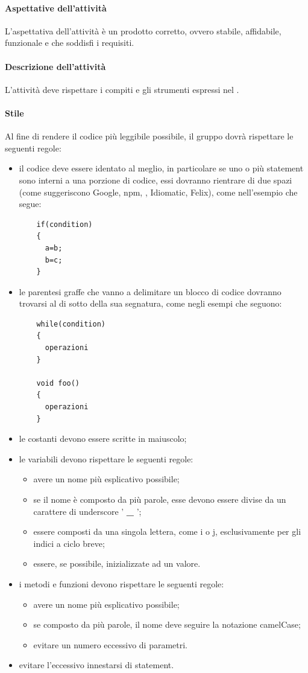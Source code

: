  \paragraph{Aspettative dell'attività}
 L'aspettativa dell'attività è un prodotto corretto, ovvero stabile, affidabile, funzionale e che soddisfi i requisiti.
 \paragraph{Descrizione dell'attività}
 L'attività deve rispettare i compiti e gli strumenti espressi nel \PPdocRP.
 \paragraph{Stile}

 Al fine di rendere il codice più leggibile possibile, il gruppo dovrà rispettare le seguenti regole:
 \begin{itemize}
 	\item il codice deve essere identato al meglio, in particolare se uno o più statement sono interni a una porzione di codice, essi dovranno rientrare di due spazi (come suggeriscono Google, npm, , Idiomatic, Felix), come nell'esempio che segue: \begin{lstlisting}
 	if(condition)
 	{
 	  a=b;
 	  b=c;
 	}
 	\end{lstlisting}
 	\item le parentesi graffe che vanno a delimitare un blocco di codice dovranno trovarsi al di sotto della sua segnatura, come negli esempi che seguono:
 	\begin{lstlisting}
 	while(condition)
 	{
 	  operazioni
 	}

 	void foo()
 	{
	  operazioni
 	}
 	\end{lstlisting}
 	\item le costanti devono essere scritte in maiuscolo;
 	\item le variabili devono rispettare le seguenti regole:
 	\begin{itemize}
 		\item avere un nome più esplicativo possibile;
 		\item se il nome è composto da più parole, esse devono essere divise da un carattere di underscore ' \textbf{\_} ';
 		\item essere composti da una singola lettera, come i o j, esclusivamente per gli indici a ciclo breve;
 		\item essere, se possibile, inizializzate ad un valore.
 	\end{itemize}
 	\item i metodi e funzioni devono rispettare le seguenti regole:
 	\begin{itemize}
 		\item avere un nome più esplicativo possibile;
 		\item se composto da più parole, il nome deve seguire la notazione camelCase;
 		\item evitare un numero eccessivo di parametri.
 	\end{itemize}
 	\item evitare l'eccessivo innestarsi di statement.
 \end{itemize}
